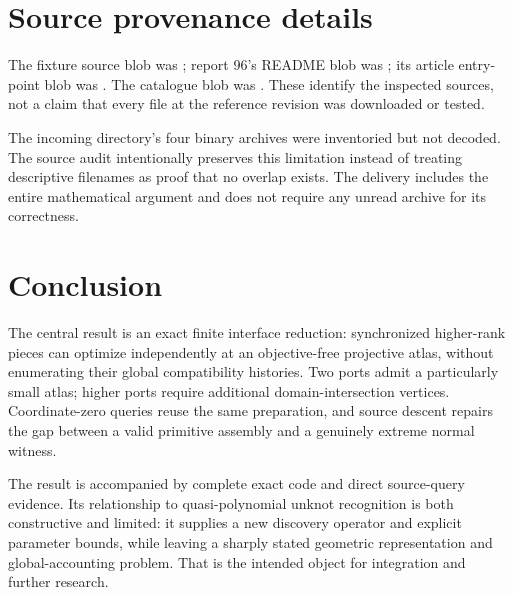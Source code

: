 \documentclass[11pt,a4paper]{article}
\theoremstyle{definition}
\theoremstyle{remark}
\begin{document}
\section{Source provenance details}
The fixture source blob was ; report 96's README blob was ; its article entry-point blob was . The catalogue blob was . These identify the inspected sources, not a claim that every file at the reference revision was downloaded or tested.

The incoming directory's four binary archives were inventoried but not decoded. The source audit intentionally preserves this limitation instead of treating descriptive filenames as proof that no overlap exists. The delivery includes the entire mathematical argument and does not require any unread archive for its correctness.

\section{Conclusion}
The central result is an exact finite interface reduction: synchronized higher-rank pieces can optimize independently at an objective-free projective atlas, without enumerating their global compatibility histories. Two ports admit a particularly small atlas; higher ports require additional domain-intersection vertices. Coordinate-zero queries reuse the same preparation, and source descent repairs the gap between a valid primitive assembly and a genuinely extreme normal witness.

The result is accompanied by complete exact code and direct source-query evidence. Its relationship to quasi-polynomial unknot recognition is both constructive and limited: it supplies a new discovery operator and explicit parameter bounds, while leaving a sharply stated geometric representation and global-accounting problem. That is the intended object for integration and further research.

\end{document}

